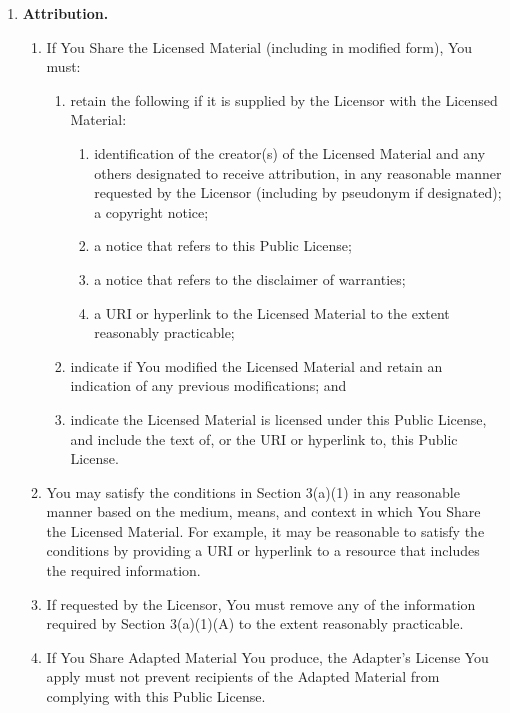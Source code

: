 \begin{enumerate}[label=\alph*.]
  \item \textbf{Attribution.}

    \begin{enumerate}[label=\arabic*.]
      \item If You Share the Licensed Material (including in modified form), You must:

        \begin{enumerate}[label=\Alph*.]
          \item retain the following if it is supplied by the Licensor with the Licensed Material:

            \begin{enumerate}[label=\roman*.]
              \item identification of the creator(s) of the Licensed Material and any others designated to receive attribution, in any reasonable manner requested by the Licensor (including by pseudonym if designated);
              a copyright notice;

              \item a notice that refers to this Public License;

              \item a notice that refers to the disclaimer of warranties;

              \item a URI or hyperlink to the Licensed Material to the extent reasonably practicable;
            \end{enumerate}

          \item indicate if You modified the Licensed Material and retain an indication of any previous modifications; and

          \item  indicate the Licensed Material is licensed under this Public License, and include the text of, or the URI or hyperlink to, this Public License.
        \end{enumerate}

        \item You may satisfy the conditions in Section 3(a)(1) in any reasonable manner based on the medium, means, and context in which You Share the Licensed Material. For example, it may be reasonable to satisfy the conditions by providing a URI or hyperlink to a resource that includes the required information.

        \item If requested by the Licensor, You must remove any of the information required by Section 3(a)(1)(A) to the extent reasonably practicable.

        \item If You Share Adapted Material You produce, the Adapter's License You apply must not prevent recipients of the Adapted Material from complying with this Public License.
    \end{enumerate}
\end{enumerate}

